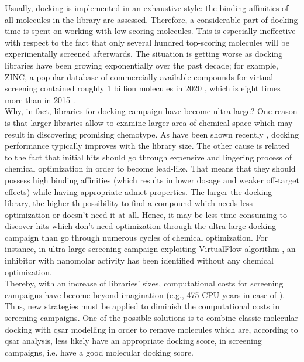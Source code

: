 
Usually, docking is implemented in an exhaustive style: the binding affinities of all molecules in the library are assessed.
Therefore, a considerable part of docking time is spent on working with low-scoring molecules.
This is especially ineffective with respect to the fact that only several hundred top-scoring molecules will be experimentally screened afterwards.
The situation is getting worse as docking libraries have been growing exponentially over the past decade; for example, ZINC, a popular database of commercially available compounds for virtual screening contained roughly 1 billion molecules in 2020 {\cite{Irwin2020ZINC20Discovery}}, which is eight times more than in 2015 {\cite{Sterling2015ZINCEveryone}}.\\

Why, in fact, libraries for docking campaign have become ultra-large?
One reason is that larger libraries allow to examine larger area of chemical space which may result in discovering promising chemotype. 
As have been shown recently {\cite{Lyu2019Ultra-largeChemotypes}}, docking performance typically improves with the library size.  
The other cause is related to the fact that initial hits should go through expensive and lingering process of chemical optimization in order to become lead-like.
That means that they should possess high binding affinities (which results in lower dosage and weaker off-target effects) while having appropriate \acrshort{admet} properties.
The larger the docking library, the higher th possibility to find a compound which needs less optimization or doesn't need it at all.
Hence, it may be less time-consuming to discover hits which don't need optimization through the ultra-large docking campaign than go through numerous cycles of chemical optimization.
For instance, in ultra-large screening campaign exploiting VirtualFlow algorithm {\cite{Gorgulla2020AnScreens}}, an inhibitor with nanomolar activity has been identified without any chemical optimization.\\

Thereby, with an increase of libraries' sizes, computational costs for screening campaigns have become beyond imagination (e.g.,  475 CPU-years in case of \cite{Gorgulla2020AnScreens}).
Thus, new strategies must be applied to diminish the computational costs in screening campaigns.
One of the possible solutions is to combine classic molecular docking with \acrshort{qsar} modelling in order to remove molecules which are, according to \acrshort{qsar} analysis, less likely have an appropriate docking score, in screening campaigns, i.e. have a good molecular docking score. \\

